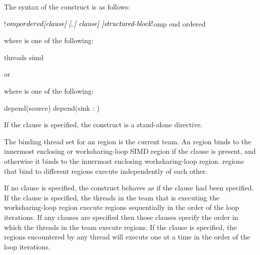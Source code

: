 \begin{fortranspecific}
The syntax of the  construct is as follows:

\begin{ompfPragma}
!$omp ordered \plc{[clause[ [},\plc{] clause] ]}
    \plc{structured-block}
!$omp end ordered
\end{ompfPragma}

where  is one of the following:
\begin{indentedcodelist}
threads
simd
\end{indentedcodelist}

or


where  is one of the following:
\begin{indentedcodelist}
depend(source)
depend(sink : )
\end{indentedcodelist}
\end{fortranspecific}

If the  clause is specified, the  construct is a 
stand-alone directive.

\binding
The binding thread set for an  region is the current team. An 
 region binds to the innermost enclosing  or 
worksharing-loop SIMD region if the  clause is present, and otherwise 
it binds to the innermost enclosing worksharing-loop region.  
regions that bind to different regions execute independently of each other.

\descr
If no clause is specified, the  construct behaves as if the
 clause had been specified. If the  clause is
specified, the threads in the team that is executing the worksharing-loop 
region execute  regions sequentially in the order of the loop 
iterations. If any  clauses are specified then those clauses 
specify the order in which the threads in the team execute  
regions. If the  clause is specified, the  regions 
encountered by any thread will execute one at a time in the order of the 
loop iterations.

